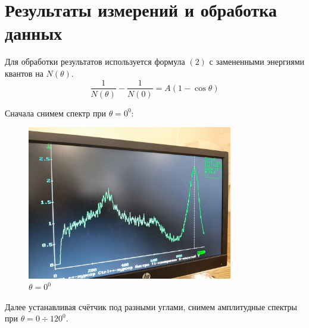 \documentclass[a4paper, 12pt]{article}
\begin{document}
\section{Результаты измерений и обработка данных}

Для обработки результатов используется формула $(2)$ с замененными энергиями квантов на $N(\theta)$.
\begin{equation}
\frac{1}{N(\theta)} - \frac{1}{N(0)} = A(1-\cos\theta)
\end{equation}

Сначала снимем спектр при $\theta = 0^0$:
\begin{figure}[h]
\begin{center}
\includegraphics[width = 0.8\textwidth]{0.jpg}
\caption{$\theta = 0^0$}
\end{center}
\end{figure}

Далее устанавливая счётчик под разными углами, снимем амплитудные спектры при $\theta = 0\div120^0$.

\newpage
\end{document}
